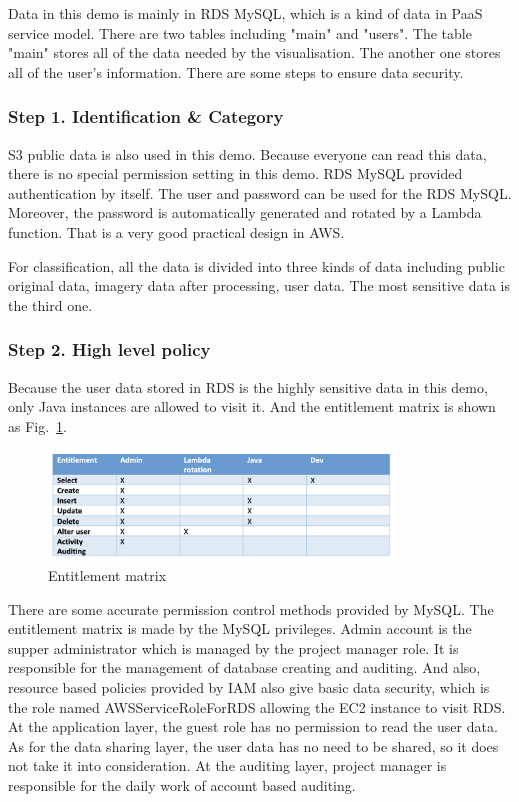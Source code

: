 \documentclass[conference]{IEEEtran}
\begin{document}
Data in this demo is mainly in RDS MySQL, which is a kind of data in PaaS service model. There are two tables including "main" and "users". The table "main" 
stores all of the data needed by the visualisation. The another one stores all of the user's information. There are some steps to ensure data security.

\subsubsection{Step 1. Identification \& Category}

S3 public data is also used in this demo. Because everyone can read this data, there is no special permission setting in this demo. RDS MySQL provided authentication 
by itself. The user and password can be used for the RDS MySQL. Moreover, the password is automatically generated and rotated by a Lambda function. That is a  
very good practical design in AWS.

For classification, all the data is divided into three kinds of data including public original data, imagery data after processing, user data. The most sensitive 
data is the third one. 

\subsubsection{Step 2. High level policy}

Because the user data stored in RDS is the highly sensitive data in this demo, only Java instances are allowed to visit it. And the entitlement matrix 
is shown as Fig.~\ref{matrix}.

\begin{figure}[htbp]
    \centerline{\includegraphics[width=260pt]{images/matrix.png}}
    \caption{Entitlement matrix}
    \label{matrix}
\end{figure}

There are some accurate permission control methods provided by MySQL. The entitlement matrix is made by the MySQL privileges. Admin account is the supper administrator 
which is managed by the project manager role. It is responsible for the management of database creating and auditing. And also, resource based policies provided 
by IAM also give basic data security, which is the role named AWSServiceRoleForRDS allowing the EC2 instance to visit RDS. At the application layer, the guest role 
has no permission to read the user data. As for the data sharing layer, the user data has no need to be shared, so it does not take it into consideration. At the auditing layer, 
project manager is responsible for the daily work of account based auditing.
\end{document}
